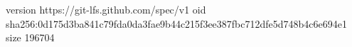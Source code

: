 version https://git-lfs.github.com/spec/v1
oid sha256:0d175d3ba841c79fda0da3fae9b44c215f3ee387fbc712dfe5d748b4c6e694e1
size 196704
